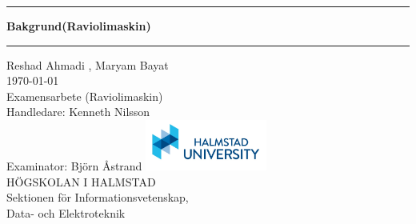 \documentclass[11pt,a4paper,oneside]{book}
\begin{document}
\pagestyle{empty}

\frontmatter

\begin{titlepage}
  \begin{center}
  \end{center}
  \vspace{3cm}
  \begin{center}
    \hrule \vspace{0.5cm}
    {\Huge \bfseries \sffamily \color{hhblue} Bakgrund(Raviolimaskin)}\\
    \vspace{0.8cm} \hrule \vspace{2cm} {\Large{Reshad Ahmadi , Maryam Bayat}}\\
    \vspace{2cm}
    \today\\
    \vspace{3cm}
    Examensarbete (Raviolimaskin)\\
    \vspace{1.5cm}
    Handledare: Kenneth Nilsson\\
    \vspace{0.5cm} Examinator: Björn Åstrand \vfill
    \includegraphics[width=4cm]{images/hh_logo.jpg}\\
    HÖGSKOLAN I HALMSTAD\\
    Sektionen för Informationsvetenskap, \\
    Data- och Elektroteknik
  \end{center}
\end{titlepage}
\end{document}

